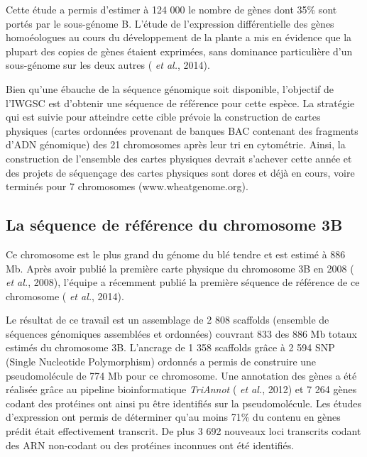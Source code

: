 \documentclass[a4paper, 12pt]{article}
\begin{document}
\begin{onehalfspace}
Cette étude a permis d'estimer à 124 000 le nombre de gènes dont 35\% sont portés par le sous-génome B. L'étude de l'expression différentielle des gènes homoéologues au cours du développement de la plante a mis en évidence que la plupart des copies de gènes étaient exprimées, sans dominance particulière d'un sous-génome sur les deux autres ( \textit{et al.}, 2014).

Bien qu'une ébauche de la séquence génomique soit disponible, l'objectif de l'IWGSC est d'obtenir une séquence de référence pour cette espèce. La stratégie qui est suivie pour atteindre cette cible prévoie la construction de cartes physiques (cartes ordonnées provenant de banques BAC contenant des fragments d'ADN génomique) des 21 chromosomes après leur tri en cytométrie. Ainsi, la construction de l'ensemble des cartes physiques devrait s'achever cette année et des projets de séquençage des cartes physiques sont dores et déjà en cours, voire terminés pour 7 chromosomes (www.wheatgenome.org).

\subsection{La séquence de référence du chromosome 3B}
Ce chromosome est le plus grand du génome du blé tendre et est estimé à 886 Mb. Après avoir publié la première carte physique du chromosome 3B en 2008 ( \textit{et al.}, 2008), l'équipe a récemment publié la première séquence de référence de ce chromosome ( \textit{et al.}, 2014).

Le résultat de ce travail est un assemblage de 2 808 scaffolds (ensemble de séquences génomiques assemblées et ordonnées) couvrant 833 des 886 Mb totaux estimés du chromosome 3B. L'ancrage de 1 358 scaffolds grâce à 2 594 SNP (Single Nucleotide Polymorphism) ordonnés a permis de construire une pseudomolécule de 774 Mb pour ce chromosome. Une annotation des gènes a été réalisée grâce au pipeline bioinformatique \textit{TriAnnot} ( \textit{et al.}, 2012) et 7 264 gènes codant des protéines ont ainsi pu être identifiés sur la pseudomolécule. Les études d'expression ont permis de déterminer qu'au moins 71\% du contenu en gènes prédit était effectivement transcrit. De plus 3 692 nouveaux loci transcrits codant des ARN non-codant ou des protéines inconnues ont été identifiés.


\end{onehalfspace}
\end{document}
